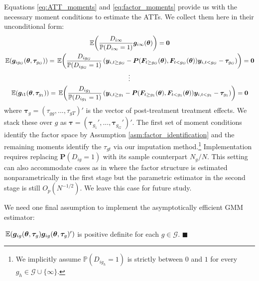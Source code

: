 \documentclass[12pt]{article}
\begin{document}
Equations \eqref{eq:ATT_moments} and \eqref{eq:factor_moments} provide us with the necessary moment conditions to estimate the ATTs. We collect them here in their unconditional form: 
\begin{gather*}
  \expec{\frac{D_{i\infty}}{\mathbb{P}(D_{i \infty} = 1)}\bm g_{i \infty}(\bm{\theta})} = \bm 0\\
  \expec{\bm g_{i g_G}(\bm{\theta}, \bm \tau_{g_G})} = \expec{ \frac{D_{ig_G}}{\mathbb{P}(D_{ig_G} = 1) } \left( \bm y_{i, t \geq g_G} - \bm P(\bm{F}_{t \geq g_G}(\bm{\theta}), \bm{F}_{t < g_G}(\bm{\theta})) \bm y_{i, t < g_G} - \bm \tau_{g_G} \right)} = \bm 0\\
  \vdots\\
  \expec{\bm g_{i 1}(\bm{\theta}, \bm \tau_{g_1})} = \expec{ \frac{D_{i g_1}}{\mathbb{P}(D_{i g_1} = 1) } \left( \bm y_{i, t \geq g_1} - \bm P(\bm{F}_{t \geq g_1}(\bm{\theta}), \bm{F}_{t < g_1}(\bm{\theta})) \bm y_{i, t < g_1} - \bm \tau_{g_1} \right)} = \bm 0
\end{gather*}
where $\bm \tau_g = (\tau_{gg},...,\tau_{gT})'$ is the vector of post-treatment treatment effects. We stack these over $g$ as $\bm \tau = (\bm \tau_{g_1}',...,\bm \tau_{g_G}')'$. The first set of moment conditions identify the factor space by Assumption \ref{asm:factor_identification} and the remaining moments identify the $\tau_{gt}$ via our imputation method.\footnote{We implicitly assume $\mathbb{P}(D_{ig_h} = 1)$ is strictly between $0$ and $1$ for every $g_h \in \mathcal{G} \cup \{\infty\}$.} Implementation requires replacing $\bm P(D_{ig} = 1)$ with its sample counterpart $N_g/N$. This setting can also accommodate cases as in \citet{Hahn_Liao_Geert_2018} where the factor structure is estimated nonparametrically in the first stage but the parametric estimator in the second stage is still $O_p(N^{-1/2})$. We leave this case for future study.


We need one final assumption to implement the asymptotically efficient GMM estimator:
\begin{assumption}\label{asm:variance_pd}
  $\expec{\bm g_{ig}(\bm{\theta}, \bm \tau_g) \bm g_{ig}(\bm{\theta}, \bm \tau_g)'}$ is positive definite for each $g \in \mathcal{G}$. $\blacksquare$
\end{assumption}
\end{document}
